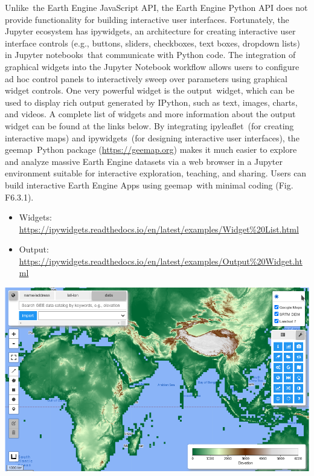 \documentclass[
  letterpaper,
  DIV=11,
  numbers=noendperiod]{scrreprt}
\providecommand{\tightlist}{%
  \setlength{\itemsep}{0pt}\setlength{\parskip}{0pt}}\usepackage{longtable,booktabs,array}
\begin{document}
Unlike~the Earth Engine JavaScript API, the Earth Engine Python API does
not provide functionality for building interactive user interfaces.
Fortunately, the Jupyter ecosystem has ipywidgets, an architecture for
creating interactive user interface controls (e.g., buttons, sliders,
checkboxes, text boxes, dropdown lists) in Jupyter notebooks~that
communicate with Python code. The integration of graphical widgets into
the Jupyter Notebook workflow allows users to configure ad hoc control
panels to interactively sweep over parameters using graphical widget
controls. One very powerful widget is the output~widget, which can be
used to display rich output generated by IPython, such as text, images,
charts, and videos. A complete list of widgets and more information
about the output widget can be found at the links below. By integrating
ipyleaflet~(for creating interactive maps) and ipywidgets~(for designing
interactive user interfaces), the geemap~Python package
(\href{https://www.google.com/url?q=https://geemap.org\&sa=D\&source=editors\&ust=1671458841274245\&usg=AOvVaw3rVUS8lKoS9clb8r42oxe0}{https://geemap.org})
makes it much easier to explore and analyze massive Earth Engine
datasets via a web browser in a Jupyter environment suitable for
interactive exploration, teaching, and sharing. Users can build
interactive Earth Engine Apps using geemap~with minimal coding (Fig.
F6.3.1).

\begin{itemize}
\tightlist
\item
  Widgets:
  \href{https://www.google.com/url?q=https://ipywidgets.readthedocs.io/en/latest/examples/Widget\%2520List.html\&sa=D\&source=editors\&ust=1671458841274780\&usg=AOvVaw2SzMGW9F4r3E-llbiCksCA}{https://ipywidgets.readthedocs.io/en/latest/examples/Widget\%20List.html}~
\item
  Output:
  \href{https://www.google.com/url?q=https://ipywidgets.readthedocs.io/en/latest/examples/Output\%2520Widget.html\&sa=D\&source=editors\&ust=1671458841275255\&usg=AOvVaw13a3qsly2f0mg0egoTAMqw}{https://ipywidgets.readthedocs.io/en/latest/examples/Output\%20Widget.html}~
\end{itemize}

\includegraphics{./F6/image1.png}
\end{document}
